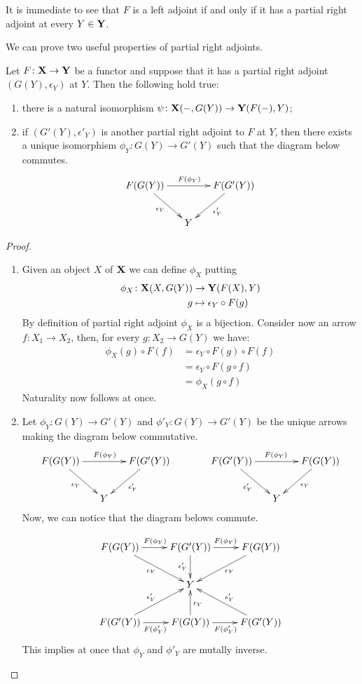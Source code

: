 \begin{remark}
	It is immediate to see that $F$ is a left adjoint if and only if it has a partial right adjoint at every $Y\in \textbf {\textup{Y}}$.
\end{remark}

We can prove two  useful properties of partial right adjoints.

\begin{proposition}\label{prop:uni}
	Let $F\colon \textbf {\textup{X}}\to \textbf {\textup{Y}}$ be a functor and suppose that it has a partial right adjoint $(G(Y), \epsilon_Y)$ at $Y$. Then the following hold true:
	\begin{enumerate}
\item there is a natural isomorphism $\psi\colon \textbf {\textup{X}}(-, G(Y))\to \textbf {\textup{Y}}(F(-), Y)$;
\item if $(G'(Y), \epsilon'_Y)$ is another partial right adjoint to $F$ at $Y$, then there exists a unique isomorphism $\phi_Y\colon G(Y)\to G'(Y)$ such that the diagram below commutes.
\[\xymatrix@C=15pt{F(G(Y)) \ar[rr]^{F(\phi_Y)} \ar[dr]_{\epsilon_Y} & &F(G'(Y)) \ar[dl]^{\epsilon'_Y}\\ & Y}\]
	\end{enumerate}
\end{proposition}
\begin{proof}
	\begin{enumerate}
		\item Given an object $X$ of $\textbf {\textup{X}}$ we can define $\phi_X$ putting
		\begin{align*}
			\phi_X \colon \textbf {\textup{X}}(X, G(Y))&\to \textbf {\textup{Y}}(F(X), Y)\\
			g&\mapsto \epsilon_Y\circ F(g)
		\end{align*}
		By definition of partial right adjoint $\phi_X$ is a bijection. Consider now an arrow $f\colon X_1\to X_2$, then, for every $g\colon X_2\to G(Y)$ we have:
		\begin{align*}
			\phi_X(g)\circ F(f)&=\epsilon_Y\circ F(g)\circ F(f)\\&= \epsilon_Y\circ F(g\circ f)\\&=\phi_X(g\circ f)
		\end{align*}
		Naturality now follows at once.
		
		\item Let $\phi_Y\colon G(Y)\to G'(Y)$ and $\phi'_Y\colon G(Y)\to G'(Y)$ be the unique arrows making the diagram below commutative.
\[\xymatrix@C=15pt{F(G(Y)) \ar[rr]^{F(\phi_Y)} \ar[dr]_{\epsilon_Y} & &F(G'(Y)) \ar[dl]^{\epsilon'_Y} && F(G'(Y)) \ar[rr]^{F(\phi_Y)} \ar[dr]_{\epsilon'_Y} & &F(G(Y)) \ar[dl]^{\epsilon_Y}\\ & Y &&&&Y}\]
		Now, we can notice that the diagram belows commute.
	
	\[\xymatrix{F(G(Y)) \ar[r]^{F(\phi_Y)} \ar[dr]_{\epsilon_Y} &F(G'(Y)) \ar[r]^{F(\phi_Y)} \ar[d]_{\epsilon'_Y} & F(G(Y)) \ar[dl]^{\epsilon_Y} \\ & Y \\ F(G'(Y)) \ar[r]_{F(\phi'_Y)} \ar[ur]^{\epsilon'_Y} &F(G(Y)) \ar[r]_{F(\phi'_Y)} \ar[u]_{\epsilon_Y} & F(G'(Y)) \ar[ul]_{\epsilon'_Y}}\]	
This implies at once that $\phi_Y$ and $\phi'_Y$ are mutally inverse. \qedhere 
	\end{enumerate}
	
\end{proof}

